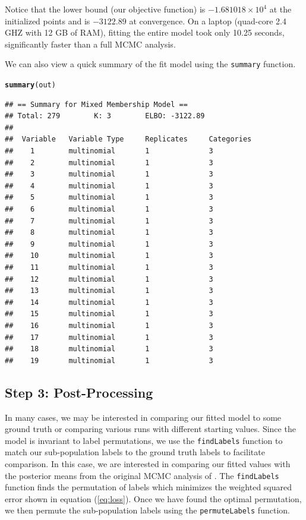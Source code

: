 \documentclass{article}\usepackage[]{graphicx}\usepackage[]{color}
\makeatletter
\newcommand{\hlstd}[1]{\textcolor[rgb]{0.345,0.345,0.345}{#1}}%
\newcommand{\hlkwd}[1]{\textcolor[rgb]{0.737,0.353,0.396}{\textbf{#1}}}%
\newenvironment{kframe}{%
 \def\at@end@of@kframe{}%
 \ifinner\ifhmode%
  \def\at@end@of@kframe{\end{minipage}}%
  \begin{minipage}{\columnwidth}%
 \fi\fi%
 \def\FrameCommand##1{\hskip\@totalleftmargin \hskip-\fboxsep
 \colorbox{shadecolor}{##1}\hskip-\fboxsep
     \hskip-\linewidth \hskip-\@totalleftmargin \hskip\columnwidth}%
 \MakeFramed {\advance\hsize-\width
   \@totalleftmargin\z@ \linewidth\hsize
   \@setminipage}}%
 {\par\unskip\endMakeFramed%
 \at@end@of@kframe}
\newenvironment{knitrout}{}{} %
\renewenvironment{knitrout}{\begin{singlespace}}{\end{singlespace}}
\makeatother
\begin{document}
Notice that the lower bound (our objective function) is \ensuremath{-1.681018\times 10^{4}} at the initialized points and is \ensuremath{-3122.89} at convergence. On a laptop (quad-core 2.4 GHZ with 12 GB of RAM), fitting the entire model took only 10.25 seconds, significantly faster than a full MCMC analysis. 

We can also view a quick summary of the fit model using the \texttt{summary} function.

\begin{knitrout}
\color{fgcolor}\begin{kframe}
\begin{alltt}
\hlkwd{summary}\hlstd{(out)}
\end{alltt}
\begin{verbatim}
## == Summary for Mixed Membership Model ==
## Total: 279		 K: 3		 ELBO: -3122.89
## 
##  Variable   Variable Type     Replicates     Categories  
##    1        multinomial       1              3           
##    2        multinomial       1              3           
##    3        multinomial       1              3           
##    4        multinomial       1              3           
##    5        multinomial       1              3           
##    6        multinomial       1              3           
##    7        multinomial       1              3           
##    8        multinomial       1              3           
##    9        multinomial       1              3           
##    10       multinomial       1              3           
##    11       multinomial       1              3           
##    12       multinomial       1              3           
##    13       multinomial       1              3           
##    14       multinomial       1              3           
##    15       multinomial       1              3           
##    16       multinomial       1              3           
##    17       multinomial       1              3           
##    18       multinomial       1              3           
##    19       multinomial       1              3
\end{verbatim}
\end{kframe}
\end{knitrout}

\subsection{Step 3: Post-Processing} \label{postProcess}
In many cases, we may be interested in comparing our fitted model to some ground truth or comparing various runs with different starting values. Since the model is invariant to label permutations, we use the \texttt{findLabels} function to match our sub-population labels to the ground truth labels to facilitate comparison. In this case, we are interested in comparing our fitted values with the posterior means from the original MCMC analysis of \cite{grossManriqueVallier}. The \texttt{findLabels} function finds the permutation of labels which minimizes the weighted squared error shown in equation (\ref{eq:loss}). Once we have found the optimal permutation, we then permute the sub-population labels using the \texttt{permuteLabels} function. 
\end{document}
